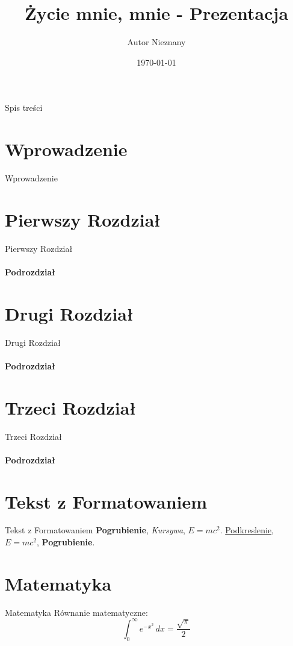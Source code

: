 \documentclass{beamer}
\title{Życie mnie, mnie - Prezentacja}
\author{Autor Nieznany}
\date{\today}
\begin{document}
\begin{frame}
    \titlepage
\end{frame}

\begin{frame}{Spis treści}
    \tableofcontents
\end{frame}

\section{Wprowadzenie}
\begin{frame}{Wprowadzenie}
    \lipsum[1]
\end{frame}

\section{Pierwszy Rozdział}
\begin{frame}{Pierwszy Rozdział}
    \framesubtitle{Podrozdział}
    \lipsum[2-4]
\end{frame}

\section{Drugi Rozdział}
\begin{frame}{Drugi Rozdział}
    \framesubtitle{Podrozdział}
    \lipsum[5-7]
\end{frame}

\section{Trzeci Rozdział}
\begin{frame}{Trzeci Rozdział}
    \framesubtitle{Podrozdział}
    \lipsum[8-15]
\end{frame}

\section{Tekst z Formatowaniem}
\begin{frame}{Tekst z Formatowaniem}
    \textbf{Pogrubienie}, \emph{Kursywa}, $E=mc^2$.
    \underline{Podkreslenie}, $E=mc^2$, \textbf{Pogrubienie}.
\end{frame}

\section{Matematyka}
\begin{frame}{Matematyka}
    Równanie matematyczne:
    \begin{equation}
        \int_{0}^{\infty} e^{-x^2} \, dx = \frac{\sqrt{\pi}}{2}
    \end{equation}
\end{frame}
\end{document}
